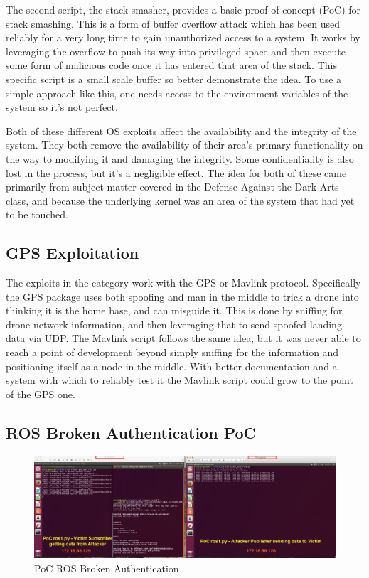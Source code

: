 \documentclass[IEEEtran,letterpaper,10pt,notitlepage,draftclsnofoot]{article}
\begin{document}
The second script, the stack smasher, provides a basic proof of concept (PoC) for stack smashing. \cite{SS}
This is a form of buffer overflow attack which has been used reliably for a very long time to gain unauthorized access to a system.
It works by leveraging the overflow to push its way into privileged space and then execute some form of malicious code once it has entered that area of the stack. \cite{SS2}
This specific script is a small scale buffer so better demonstrate the idea.
To use a simple approach like this, one needs access to the environment variables of the system so it's not perfect.

Both of these different OS exploits affect the availability and the integrity of the system.
They both remove the availability of their area's primary functionality on the way to modifying it and damaging the integrity.
Some confidentiality is also lost in the process, but it's a negligible effect.
The idea for both of these came primarily from subject matter covered in the Defense Against the Dark Arts class, and because the underlying kernel was an area of the system that had yet to be touched.

\subsection{GPS Exploitation}
The exploits in the category work with the GPS or Mavlink protocol.
Specifically the GPS package uses both spoofing and man in the middle to trick a drone into thinking it is the home base, and can misguide it.
This is done by sniffing for drone network information, and then leveraging that to send spoofed landing data via UDP.
The Mavlink script follows the same idea, but it was never able to reach a point of development beyond simply sniffing for the information and positioning itself as a node in the middle.
With better documentation and a system with which to reliably test it the Mavlink script could grow to the point of the GPS one.

\subsection{ROS Broken Authentication PoC}
\begin{figure}[H]
  \centering
    \includegraphics[width=\textwidth]{poc1}
    \caption{PoC ROS Broken Authentication}
\end{figure}
\end{document}
